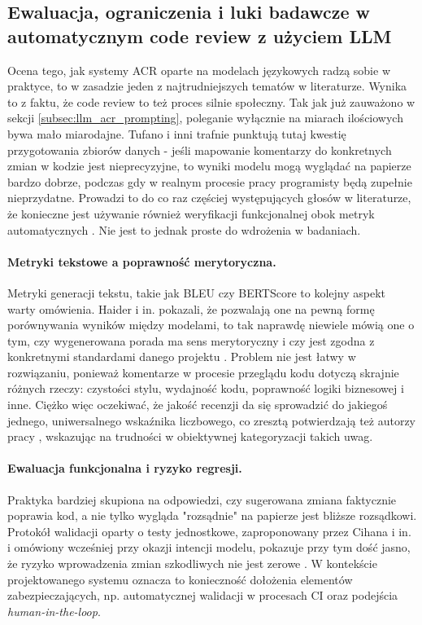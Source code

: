 \subsection{Ewaluacja, ograniczenia i luki badawcze w automatycznym code review z użyciem LLM}
\label{subsec:llm_acr_evaluation_gaps}

Ocena tego, jak systemy ACR oparte na modelach językowych radzą sobie w praktyce, 
to w zasadzie jeden z najtrudniejszych tematów w literaturze. Wynika to z faktu, że code review to też proces silnie
społeczny. Tak jak już zauważono w sekcji \ref{subsec:llm_acr_prompting}, poleganie wyłącznie na miarach
ilościowych bywa mało miarodajne. Tufano i inni \cite{Tufano2024CodeReviewAutomation} trafnie punktują tutaj kwestię przygotowania zbiorów 
danych - jeśli mapowanie komentarzy do konkretnych zmian w kodzie jest nieprecyzyjne, to wyniki 
modelu mogą wyglądać na papierze bardzo dobrze, podczas gdy w realnym procesie pracy programisty będą 
zupełnie nieprzydatne. Prowadzi to do co raz częściej występujących głosów w literaturze, że konieczne jest używanie
również weryfikacji funkcjonalnej obok metryk automatycznych \cite{Tufano2024CodeReviewAutomation, Zhang2024SurveyLLMSE}.
Nie jest to jednak proste do wdrożenia w badaniach.

\paragraph{Metryki tekstowe a poprawność merytoryczna.}
Metryki generacji tekstu, takie jak BLEU czy BERTScore to kolejny aspekt warty omówienia. Haider 
i in. \cite{Haider2024PromptingFineTuningRCG} pokazali, że pozwalają one na pewną formę porównywania wyników między modelami, 
to tak naprawdę niewiele mówią one o tym, czy wygenerowana porada ma sens merytoryczny i czy jest zgodna z konkretnymi
standardami danego projektu \cite{Tufano2024CodeReviewAutomation}. Problem nie jest łatwy w rozwiązaniu, ponieważ
komentarze w procesie przeglądu kodu dotyczą skrajnie różnych rzeczy: czystości stylu, wydajność kodu, poprawność
logiki biznesowej i inne. Ciężko więc oczekiwać, że jakość recenzji da się 
sprowadzić do jakiegoś jednego, uniwersalnego wskaźnika liczbowego, co zresztą potwierdzają też autorzy pracy \cite{Li2025CodeDoctor}, 
wskazując na trudności w obiektywnej kategoryzacji takich uwag.

\paragraph{Ewaluacja funkcjonalna i ryzyko regresji.}
Praktyka bardziej skupiona na odpowiedzi, czy sugerowana zmiana faktycznie poprawia
kod, a nie tylko wygląda "rozsądnie" na papierze jest bliższe rozsądkowi. Protokół walidacji oparty o testy jednostkowe, zaproponowany
przez Cihana i in. i omówiony wcześniej przy okazji intencji modelu, pokazuje przy tym dość jasno, że ryzyko wprowadzenia
zmian szkodliwych nie jest zerowe \cite{Cihan2025EvaluatingLLMsForCodeReview}. W kontekście projektowanego systemu
oznacza to konieczność dołożenia elementów zabezpieczających, np. automatycznej walidacji w procesach CI
oraz podejścia \emph{human-in-the-loop}.


